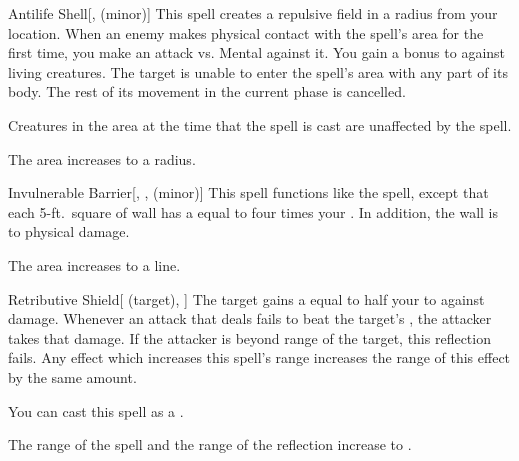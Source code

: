 \lowercase{\hypertarget{spell:Antilife Shell}{}}\label{spell:Antilife Shell}
\begin{freeability}[Rank 6]{\hypertarget{spell:Antilife Shell}{Antilife Shell}}[,  (minor)]
This spell creates a repulsive field in a \areamed radius  from your location.
When an enemy makes physical contact with the spell's area for the first time, you make an attack vs. Mental against it.
You gain a  bonus to  against living creatures.
\hit The target is unable to enter the spell's area with any part of its body.
The rest of its movement in the current phase is cancelled.

Creatures in the area at the time that the spell is cast are unaffected by the spell.

\rankline
{} The area increases to a \arealarge radius.
\end{freeability}
\vspace{0.25em}



\lowercase{\hypertarget{spell:Invulnerable Barrier}{}}\label{spell:Invulnerable Barrier}
\begin{freeability}[Rank 6]{\hypertarget{spell:Invulnerable Barrier}{Invulnerable Barrier}}[, ,  (minor)]
\targetrule
This spell functions like the  spell, except that each 5-ft.\ square of wall has a  equal to four times your .
In addition, the wall is  to physical damage.

 The area increases to a \arealarge line.
\end{freeability}
\vspace{0.25em}



\lowercase{\hypertarget{spell:Retributive Shield}{}}\label{spell:Retributive Shield}
\begin{attuneability}[Rank 6]{\hypertarget{spell:Retributive Shield}{Retributive Shield}}[ (target), ]
The target gains a  equal to half your  to  against  damage.
Whenever an attack that deals  fails to beat the target's , the attacker takes that damage.
If the attacker is beyond \rngclose range of the target, this reflection fails.
Any effect which increases this spell's range increases the range of this effect by the same amount.

You can cast this spell as a .

\rankline
{} The range of the spell and the range of the reflection increase to \rngmed.
\end{attuneability}
\vspace{0.25em}



